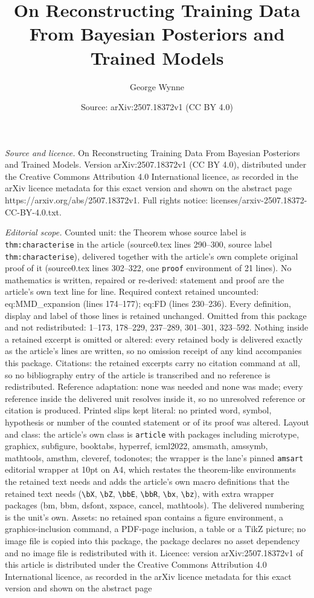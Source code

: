 \documentclass[10pt,a4paper]{amsart}
\title[On Reconstructing Training Data From Bayesian Posteriors and]{On Reconstructing Training Data From Bayesian Posteriors and Trained Models}
\author{George Wynne}
\date{Source: arXiv:2507.18372v1 (CC BY 4.0)}
\begin{document}
\maketitle

\noindent\emph{Source and licence.} On Reconstructing Training Data From Bayesian Posteriors and Trained Models. Version arXiv:2507.18372v1 (CC BY 4.0), distributed under the Creative Commons Attribution 4.0 International licence, as recorded in the arXiv licence metadata for this exact version and shown on the abstract page https://arxiv.org/abs/2507.18372v1. Full rights notice: licenses/arxiv-2507.18372-CC-BY-4.0.txt.\par\smallskip

\noindent\textit{Editorial scope.} Counted unit: the Theorem whose source label is \texttt{thm:characterise} in the article (source0.tex lines 290--300, source label \texttt{thm:characterise}), delivered together with the article's own complete original proof of it (source0.tex lines 302--322, one \texttt{proof} environment of 21 lines). No mathematics is written, repaired or re-derived: statement and proof are the article's own text line for line. Required context retained uncounted: eq:MMD\_expansion (lines 174--177); eq:FD (lines 230--236). Every definition, display and label of those lines is retained unchanged. Omitted from this package and not redistributed: 1--173, 178--229, 237--289, 301--301, 323--592. Nothing inside a retained excerpt is omitted or altered: every retained body is delivered exactly as the article's lines are written, so no omission receipt of any kind accompanies this package. Citations: the retained excerpts carry no citation command at all, so no bibliography entry of the article is transcribed and no reference is redistributed. Reference adaptation: none was needed and none was made; every reference inside the delivered unit resolves inside it, so no unresolved reference or citation is produced. Printed slips kept literal: no printed word, symbol, hypothesis or number of the counted statement or of its proof was altered. Layout and class: the article's own class is \texttt{article} with packages including microtype, graphicx, subfigure, booktabs, hyperref, icml2022, amsmath, amssymb, mathtools, amsthm, cleveref, todonotes; the wrapper is the lane's pinned \texttt{amsart} editorial wrapper at 10pt on A4, which restates the theorem-like environments the retained text needs and adds the article's own macro definitions that the retained text needs (\texttt{\textbackslash bX}, \texttt{\textbackslash bZ}, \texttt{\textbackslash bbE}, \texttt{\textbackslash bbR}, \texttt{\textbackslash bx}, \texttt{\textbackslash bz}), with extra wrapper packages (bm, bbm, dsfont, xspace, cancel, mathtools). The delivered numbering is the unit's own. Assets: no retained span contains a figure environment, a graphics-inclusion command, a PDF-page inclusion, a table or a TikZ picture; no image file is copied into this package, the package declares no asset dependency and no image file is redistributed with it. Licence: version arXiv:2507.18372v1 of this article is distributed under the Creative Commons Attribution 4.0 International licence, as recorded in the arXiv licence metadata for this exact version and shown on the abstract page 
\end{document}
